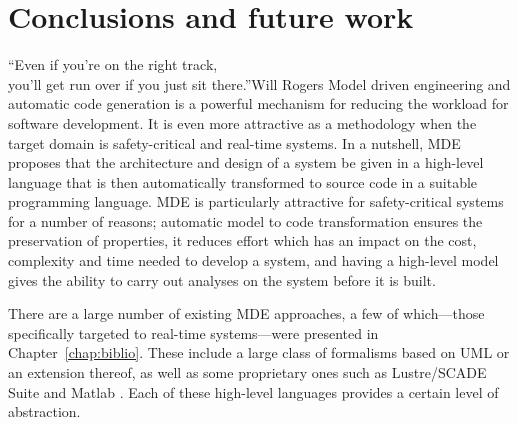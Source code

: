 \chapter{Conclusions and future work}{``Even if you're on the right
  track,\\you'll get run over if you just sit there.''}{Will Rogers}
\label{chap:conclusions}
Model driven engineering and automatic code generation is a powerful
mechanism for reducing the workload for software development. It is
even more attractive as a methodology when the target domain is
safety-critical and real-time systems. In a nutshell, MDE proposes
that the architecture and design of a system be given in a high-level
language that is then automatically transformed to source code in a
suitable programming language. MDE is particularly attractive for
safety-critical systems for a number of reasons; automatic model to
code transformation ensures the preservation of properties, it reduces
effort which has an impact on the cost, complexity and time needed to
develop a system, and having a high-level model gives the ability to
carry out analyses on the system before it is built.

There are a large number of existing MDE approaches, a few of
which---those specifically targeted to real-time systems---were
presented in Chapter~\ref{chap:biblio}. These include a large class of
formalisms based on UML or an extension thereof, as well as some
proprietary ones such as Lustre/SCADE Suite and Matlab \simu. Each of
these high-level languages provides a certain level of abstraction. 

